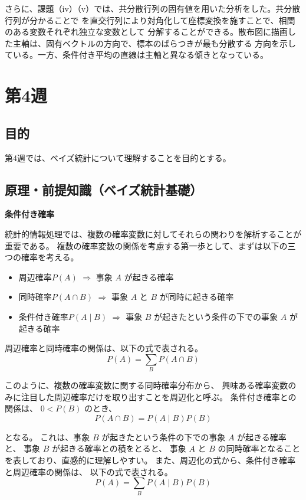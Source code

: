 \documentclass[10pt,a4paper,titlepage]{jreport} %
\begin{document}
さらに、課題（iv）（v）では、共分散行列の固有値を用いた分析をした。共分散行列が分かることで
を直交行列により対角化して座標変換を施すことで、相関のある変数それぞれ独立な変数として
分解することができる。散布図に描画した主軸は、固有ベクトルの方向で、標本のばらつきが最も分散する
方向を示している。一方、条件付き平均の直線は主軸と異なる傾きとなっている。


\chapter{第4週}

\section{目的}

第4週では、ベイズ統計について理解することを目的とする。

\section{原理・前提知識（ベイズ統計基礎）}

\textbf{条件付き確率}

統計的情報処理では、複数の確率変数に対してそれらの関わりを解析することが重要である。
複数の確率変数の関係を考慮する第一歩として、まずは以下の三つの確率を考える。

\begin{itemize}
\item 周辺確率$P(A)$  
$\Rightarrow$ 事象 $A$ が起きる確率
\item 同時確率$P(A \cap B)$  
$\Rightarrow$ 事象 $A$ と $B$ が同時に起きる確率
\item 条件付き確率$P(A \mid B)$  
$\Rightarrow$ 事象 $B$ が起きたという条件の下での事象 $A$ が起きる確率
\end{itemize}

周辺確率と同時確率の関係は、以下の式で表される。
\begin{equation}
P(A) = \sum_{B} P(A \cap B)
\end{equation}

このように、複数の確率変数に関する同時確率分布から、
興味ある確率変数のみに注目した周辺確率だけを取り出すことを周辺化と呼ぶ。
条件付き確率との関係は、
$0 < P(B)$ のとき、
\begin{equation}
P(A \cap B) = P(A \mid B)P(B)
\end{equation}

となる。
これは、事象 $B$ が起きたという条件の下での事象 $A$ が起きる確率と、
事象 $B$ が起きる確率との積をとると、
事象 $A$ と $B$ の同時確率となることを表しており、直感的に理解しやすい。
また、周辺化の式から、条件付き確率と周辺確率の関係は、
以下の式で表される。
\begin{equation}
P(A) = \sum_{B} P(A \mid B)P(B)
\end{equation}
\end{document}
